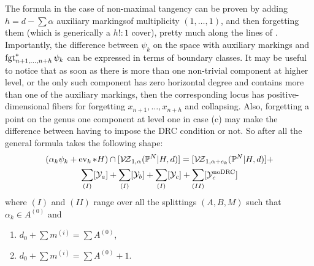 The formula in the case of non-maximal tangency can be proven by adding $h=d-\sum\alpha$ auxiliary markingsof multiplicity $(1,\ldots,1)$, and then forgetting them (which is generically a $h!\colon 1$ cover), pretty much along the lines of \cite[Corollary 3.5]{Ga}. Importantly, the difference between $\psi_k$ on the space with auxiliary markings and $\operatorname{fgt}_{n+1,\ldots,n+h}^*\psi_k$ can be expressed in terms of boundary classes. It may be useful to notice that as soon as there is more than one non-trivial component at higher level, or the only such component has zero horizontal degree and contains more than one of the auxiliary markings, then the corresponding locus has positive-dimensional fibers for forgetting $x_{n+1},\ldots,x_{n+h}$ and collapsing. Also, forgetting a point on the genus one component at level one in case (c) may make the difference between having to impose the DRC condition or not. So after all the general formula takes the following shape:
\begin{multline*}(\alpha_k\psi_k+\operatorname{ev}_k*H)\cap[\mathcal{V\!Z}_{1,\alpha}(\mathbb P^N|H,d)]=[\mathcal{V\!Z}_{1,\alpha+e_k}(\mathbb P^N|H,d)]+\\ \sum_{(I)}[\mathcal Y_a]+\sum_{(I)}[\mathcal Y_b]+\sum_{(I)}[\mathcal Y_c]+\sum_{(II)}[\mathcal Y_c^{\rm{no DRC}}]\end{multline*}
where $(I)$ and $(II)$ range over all the splittings $(A,B,M)$ such that $\alpha_k\in A^{(0)}$ and
\begin{enumerate}[label=(\Roman*)]
 \item $d_0+\sum m^{(i)}=\sum A^{(0)}$,
 \item $d_0+\sum m^{(i)}=\sum A^{(0)}+1$.
\end{enumerate}

